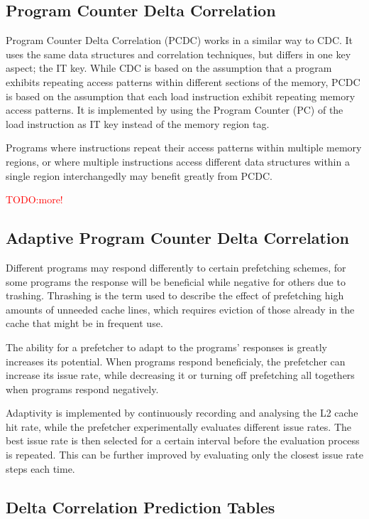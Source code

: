 \documentclass[a4paper]{IEEEtran}
\newcommand\TODO[1]{\textcolor{red}{TODO:#1}}
\newcommand\todo[1]{\TODO{#1}}
\begin{document}
\subsection{Program Counter Delta Correlation}

Program Counter Delta Correlation (PCDC) works in a similar way to CDC.
It uses the same data structures and correlation techniques, but differs in one key aspect; the IT key.
While CDC is based on the assumption that a program exhibits repeating access patterns within different sections of the memory, PCDC is based on the assumption that each load instruction exhibit repeating memory access patterns.
It is implemented by using the Program Counter (PC) of the load instruction as IT key instead of the memory region tag.

Programs where instructions repeat their access patterns within multiple memory regions, or where multiple instructions access different data structures within a single region interchangedly may benefit greatly from PCDC.

\todo{more!}

\subsection{Adaptive Program Counter Delta Correlation}

Different programs may respond differently to certain prefetching schemes, for some programs the response will be beneficial while negative for others due to trashing.
Thrashing is the term used to describe the effect of prefetching high amounts of unneeded cache lines, which requires eviction of those already in the cache that might be in frequent use.

The ability for a prefetcher to adapt to the programs' responses is greatly increases its potential.
When programs respond beneficialy, the prefetcher can increase its issue rate, while decreasing it or turning off prefetching all togethers when programs respond negatively.

Adaptivity is implemented by continuously recording and analysing the L2 cache hit rate, while the prefetcher experimentally evaluates different issue rates.
The best issue rate is then selected for a certain interval before the evaluation process is repeated.
This can be further improved by evaluating only the closest issue rate steps each time.

\subsection{Delta Correlation Prediction Tables}
\end{document}

